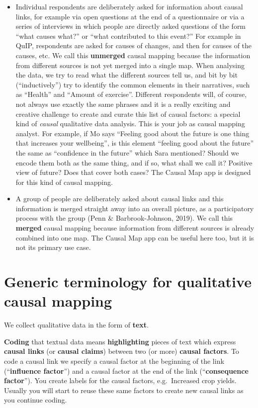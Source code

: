 \documentclass[
]{book}
\begin{document}
\begin{itemize}
\item
  Individual respondents are deliberately asked for information about causal links, for example via open questions at the end of a questionnaire or via a series of interviews in which people are directly asked questions of the form ``what causes what?'' or ``what contributed to this event?'' For example in QuIP, respondents are asked for causes of changes, and then for causes of the causes, etc. We call this \textbf{unmerged} causal mapping because the information from different sources is not yet merged into a single map. When analysing the data, we try to read what the different sources tell us, and bit by bit (``inductively'') try to identify the common elements in their narratives, such as ``Health'' and ``Amount of exercise''. Different respondents will, of course, not always use exactly the same phrases and it is a really exciting and creative challenge to create and curate this list of causal factors: a special kind of \emph{causal} qualitative data analysis. This is your job as causal mapping analyst. For example, if Mo says ``Feeling good about the future is one thing that increases your wellbeing'', is this element ``feeling good about the future'' the same as ``confidence in the future'' which Sara mentioned? Should we encode them both as the same thing, and if so, what shall we call it? Positive view of future? Does that cover both cases? The Causal Map app is designed for this kind of causal mapping.
\item
  A group of people are deliberately asked about causal links and this information is merged straight away into an overall picture, as a participatory process with the group (Penn \& Barbrook-Johnson, 2019). We call this \textbf{merged} causal mapping because information from different sources is already combined into one map. The Causal Map app can be useful here too, but it is not its primary use case.
\end{itemize}

\hypertarget{generic-terminology-for-qualitative-causal-mapping}{%
\section{Generic terminology for qualitative causal mapping}\label{generic-terminology-for-qualitative-causal-mapping}}

We collect qualitative data in the form of \textbf{text}.

\textbf{Coding} that textual data means \textbf{highlighting} pieces of text which express \textbf{causal links} (or \textbf{causal claims}) between two (or more) \textbf{causal factors}. To code a causal link we specify a causal factor at the beginning of the link (``\textbf{influence factor}'') and a causal factor at the end of the link (``\textbf{consequence factor}''). You create labels for the causal factors, e.g.~Increased crop yields. Usually you will start to reuse these same factors to create new causal links as you continue coding.
\end{document}

